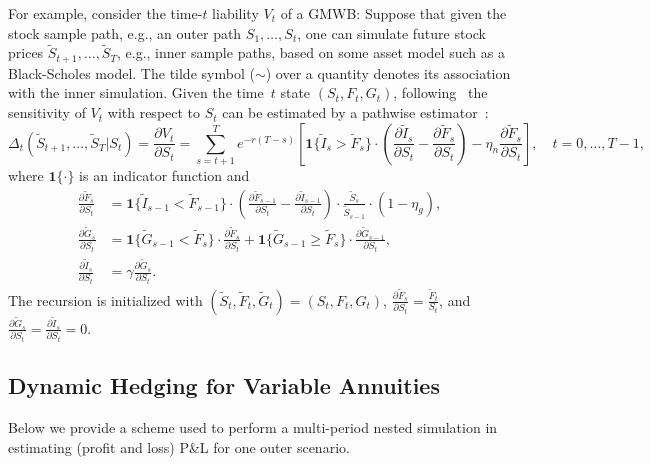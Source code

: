 \documentclass[]{article}
\newcommand{\Stilde}{\widetilde{S}}
\newcommand{\Itilde}{\widetilde{I}}
\newcommand{\Ftilde}{\widetilde{F}}
\newcommand{\Gtilde}{\widetilde{G}}
\begin{document}
For example, consider the time-$t$ liability $V_t$ of a GMWB:
Suppose that given the stock sample path, e.g., an outer path $S_1,\ldots,S_t$, one can simulate future stock prices $\Stilde_{t+1},\ldots,\Stilde_{T}$, e.g., inner sample paths, based on some asset model such as a Black-Scholes model.
The tilde symbol ($\sim$) over a quantity denotes its association with the inner simulation.
Given the time~$t$ state $(S_t,F_t,G_t)$, following~\cite{cathcart2015calculating} the sensitivity of $V_t$ with respect to $S_t$ can be estimated by a pathwise estimator~\citep{glasserman2004monte}:
\begin{equation}\label{eq:delta}
    \Delta_t(\Stilde_{t+1},\ldots,\Stilde_{T} | S_t) = \frac{\partial V_t}{\partial S_t} = \sum_{s=t+1}^{T} e^{-r(T-s)} \left[\bm{1}\{\Itilde_s > \Ftilde_s\}\cdot \left( \frac{\partial \Itilde_s}{ \partial S_t} - \frac{\partial \Ftilde_s}{ \partial S_t}\right)- \eta_n \frac{\partial \Ftilde_s}{ \partial S_t}\right], \quad t=0,\ldots,T-1,
\end{equation}
where $\bm{1}\{\cdot\}$ is an indicator function and
\begin{align*}
    \frac{\partial \Ftilde_s}{ \partial S_t} &= \bm{1}\{\Itilde_{s-1} < \Ftilde_{s-1}\}\cdot\left( \frac{\partial \Ftilde_{s-1}}{ \partial S_t} - \frac{\partial \Itilde_{s-1}}{ \partial S_t}\right) \cdot \frac{\Stilde_s}{\Stilde_{s-1}}\cdot (1-\eta_g),\\
    \frac{\partial \Gtilde_s}{ \partial S_t} &= \bm{1}\{\Gtilde_{s-1} < \Ftilde_{s}\}\cdot\frac{\partial \Ftilde_{s}}{ \partial S_t} + \bm{1}\{\Gtilde_{s-1} \geq \Ftilde_{s}\}\cdot\frac{\partial \Gtilde_{s-1}}{ \partial S_t},\\
    \frac{\partial \Itilde_s}{ \partial S_t} &= \gamma \frac{\partial \Gtilde_s}{ \partial S_t}.
\end{align*}
The recursion is initialized with $(\Stilde_t,\Ftilde_t,\Gtilde_t) = (S_t,F_t,G_t)$, $\frac{\partial \Ftilde_s}{ \partial S_t} = \frac{\Ftilde_t}{S_t}$, and $\frac{\partial \Gtilde_s}{ \partial S_t} = \frac{\partial \Itilde_s}{ \partial S_t} = 0$.


\subsection{Dynamic Hedging for Variable Annuities}\label{subsec:dynamicHedge}

Below we provide a scheme used to perform a multi-period nested simulation in estimating (profit and loss) P\&L for one outer scenario.
\end{document}
